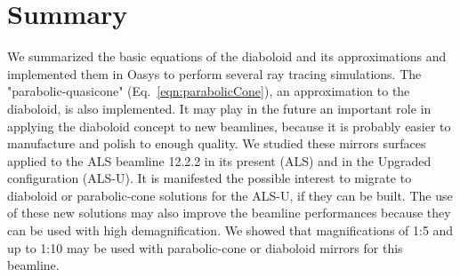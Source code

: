 \documentclass{iucr}              %
\begin{document}



\section{Summary}
\label{sec:summary}

We summarized the basic equations of the diaboloid and its approximations and implemented them in Oasys to perform several ray tracing simulations. 
The "parabolic-quasicone" (Eq.~\ref{eqn:parabolicCone}), an  approximation to the diaboloid, is also implemented. It may play in the future an important role in applying the diaboloid concept to new beamlines, because it is probably easier to manufacture and polish to enough quality. We studied these mirrors surfaces applied to the ALS beamline 12.2.2 in its present (ALS) and in the Upgraded configuration (ALS-U). It is manifested the possible interest to migrate to diaboloid or parabolic-cone solutions for the ALS-U, if they can be built. The use of these new solutions may also improve the beamline performances because they can be used with high demagnification. We showed that magnifications of 1:5 and up to 1:10 may be used with parabolic-cone or diaboloid mirrors for this beamline. 
\end{document}
